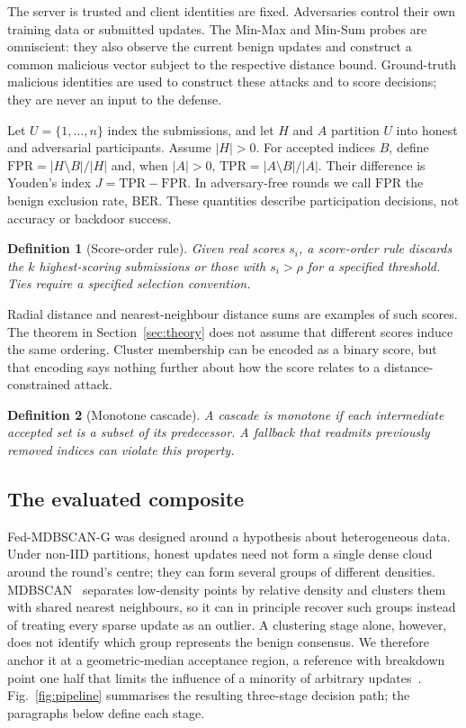 \documentclass[journal]{IEEEtran}
\newtheorem{definition}{Definition}
\newcommand{\method}{Fed-MDBSCAN-G}
\newcommand{\BER}{\mathrm{BER}}
\begin{document}
The server is trusted and client identities are fixed. Adversaries control their own training data or submitted updates. The Min-Max and Min-Sum probes are omniscient: they also observe the current benign updates and construct a common malicious vector subject to the respective distance bound. Ground-truth malicious identities are used to construct these attacks and to score decisions; they are never an input to the defense.

Let $U=\{1,\ldots,n\}$ index the submissions, and let $H$ and $A$ partition $U$ into honest and adversarial participants. Assume $|H|>0$. For accepted indices $B$, define $\mathrm{FPR}=|H\setminus B|/|H|$ and, when $|A|>0$, $\mathrm{TPR}=|A\setminus B|/|A|$. Their difference is Youden's index $J=\mathrm{TPR}-\mathrm{FPR}$. In adversary-free rounds we call $\mathrm{FPR}$ the benign exclusion rate, $\BER$. These quantities describe participation decisions, not accuracy or backdoor success.

\begin{definition}[Score-order rule]\label{def:dispersion}
Given real scores $s_i$, a score-order rule discards the $k$ highest-scoring submissions or those with $s_i>\rho$ for a specified threshold. Ties require a specified selection convention.
\end{definition}
Radial distance and nearest-neighbour distance sums are examples of such scores. The theorem in Section~\ref{sec:theory} does not assume that different scores induce the same ordering. Cluster membership can be encoded as a binary score, but that encoding says nothing further about how the score relates to a distance-constrained attack.

\begin{definition}[Monotone cascade]\label{def:cascade}
A cascade is monotone if each intermediate accepted set is a subset of its predecessor. A fallback that readmits previously removed indices can violate this property.
\end{definition}

\subsection{The evaluated composite}
\method{} was designed around a hypothesis about heterogeneous data. Under non-IID partitions, honest updates need not form a single dense cloud around the round's centre; they can form several groups of different densities. MDBSCAN~\cite{qian2024mdbscan} separates low-density points by relative density and clusters them with shared nearest neighbours, so it can in principle recover such groups instead of treating every sparse update as an outlier. A clustering stage alone, however, does not identify which group represents the benign consensus. We therefore anchor it at a geometric-median acceptance region, a reference with breakdown point one half that limits the influence of a minority of arbitrary updates~\cite{pillutla2022rfa}. Fig.~\ref{fig:pipeline} summarises the resulting three-stage decision path; the paragraphs below define each stage.
\end{document}

